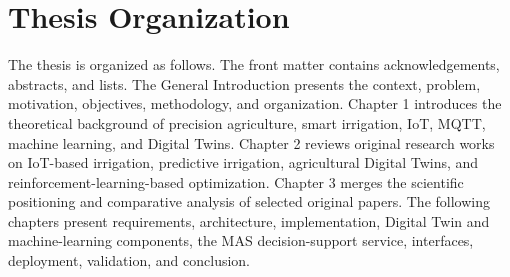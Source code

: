 \section*{Thesis Organization}

The thesis is organized as follows. The front matter contains acknowledgements, abstracts, and lists. The General Introduction presents the context, problem, motivation, objectives, methodology, and organization. Chapter 1 introduces the theoretical background of precision agriculture, smart irrigation, IoT, MQTT, machine learning, and Digital Twins. Chapter 2 reviews original research works on IoT-based irrigation, predictive irrigation, agricultural Digital Twins, and reinforcement-learning-based optimization. Chapter 3 merges the scientific positioning and comparative analysis of selected original papers. The following chapters present requirements, architecture, implementation, Digital Twin and machine-learning components, the MAS decision-support service, interfaces, deployment, validation, and conclusion.
